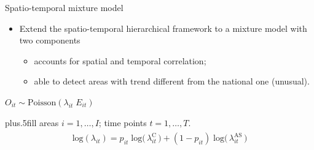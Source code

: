 \documentclass[slidestop,compress,serif,10pt]{beamer}
\begin{document}
\begin{frame}{Spatio-temporal mixture model}
\begin{itemize}
\item Extend the spatio-temporal hierarchical framework to a mixture model with two components
    \begin{itemize}
    \vfill\item accounts for spatial  and temporal correlation;
\vfill\item able to detect areas with trend different from the national one (unusual).
   \end{itemize}
\end{itemize}

 \begin{center}$O_{it} \sim \mbox{Poisson}(\lambda_{it}\; E_{it})$ \end{center}
  \vskip0pt plus.5fill
\small{areas  $i=1, \dots, I$; time points $t=1, \dots, T$}.
\medskip
\begin{align*}
\begin{split}
 \mbox{log} (\lambda_{it}) = p_{it} \;  \mbox{log}\big(\,\lambda_{it}^{\mbox{C}}\,\big)  + (1-p_{it}) \; \mbox{log}\big(\, \lambda_{it}^{\mbox{AS}}\, \big)  
\end{split}
\end{align*}

\begin{center}\end{center}



\end{frame}
\end{document}
